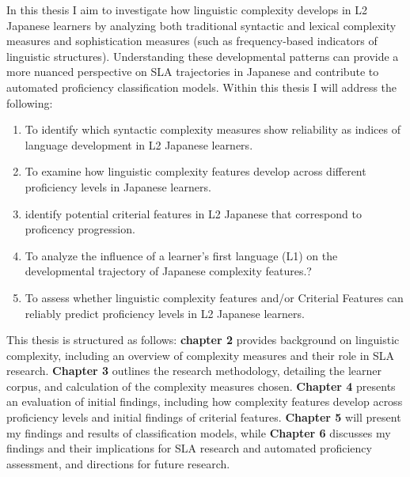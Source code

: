 In this thesis I aim to  investigate how linguistic complexity develops in L2 Japanese learners by analyzing
both traditional syntactic and lexical complexity measures and sophistication measures (such as frequency-based
indicators of linguistic structures). Understanding these developmental patterns can provide a more nuanced
perspective on SLA trajectories in Japanese and contribute to automated proficiency classification models. Within
this thesis I will address the following:
\begin{enumerate}
    \item To identify which syntactic complexity measures show reliability as indices of language development in
    L2 Japanese learners.%
    \item To examine how linguistic complexity features develop across different proficiency levels in Japanese
    learners.%
    \item identify potential criterial features in L2 Japanese that correspond to proficency progression.
    \item To analyze the influence of a learner's first language (L1) on the developmental trajectory of Japanese
    complexity features.?
    \item To assess whether linguistic complexity features and/or Criterial Features can reliably predict proficiency
    levels in L2 Japanese
    learners.
\end{enumerate}

This thesis is structured as follows: \textbf{chapter 2} provides background on linguistic complexity, including an
overview of complexity measures and their role in SLA research.
\textbf{Chapter 3} outlines the research methodology, detailing the learner corpus, and calculation of the complexity
measures chosen.
 \textbf{Chapter 4} presents an evaluation of initial findings, including how complexity features develop across
proficiency levels and initial findings of criterial features.
\textbf{Chapter 5 }will present my findings and results of classification models, while \textbf{Chapter 6}
discusses my findings and their implications for SLA research and automated proficiency assessment, and directions for
future research.